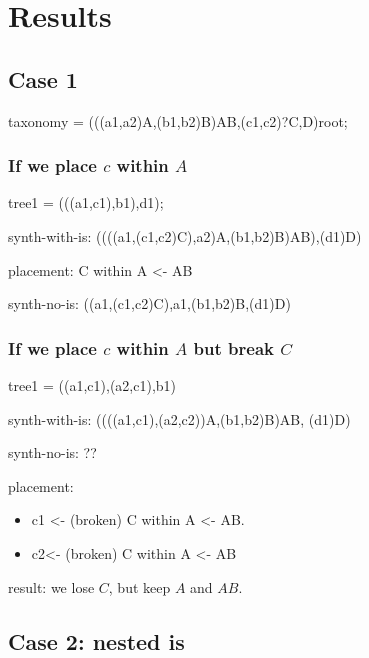\documentclass[english]{article}
\begin{document}

\section{Results}

\subsection{Case 1}

taxonomy = (((a1,a2)A,(b1,b2)B)AB,(c1,c2)?C,D)root;

\subsubsection{If we place $c$ within $A$}

tree1 = (((a1,c1),b1),d1);

synth-with-is: ((((a1,(c1,c2)C),a2)A,(b1,b2)B)AB),(d1)D)

placement: C within A <- AB

synth-no-is: ((a1,(c1,c2)C),a1,(b1,b2)B,(d1)D)

\subsubsection{If we place $c$ within $A$ but break $C$}

tree1 = ((a1,c1),(a2,c1),b1)

synth-with-is: ((((a1,c1),(a2,c2))A,(b1,b2)B)AB, (d1)D)

synth-no-is: ??

placement:  \begin{itemize} \item c1 <- (broken) C within A <- AB.
\item c2<- (broken) C within A <- AB \end{itemize} result: we lose
$C$, but keep $A$ and $AB$.

\subsection{Case 2: nested is}
\end{document}
